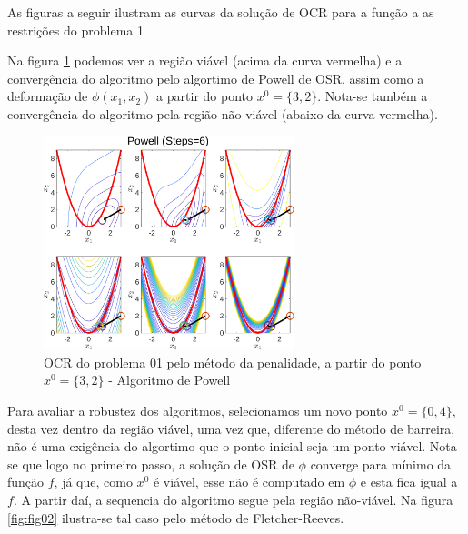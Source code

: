 \documentclass[10pt, a4paper]{article}
\begin{document}

As figuras a seguir ilustram as curvas da solu\c c\~ao de OCR para a fun\c c\~ao a as restri\c c\~oes do problema 1

Na figura \ref{fig:fig01} podemos ver a regi\~ao vi\'avel (acima da curva vermelha) e a converg\^encia do algoritmo pelo algortimo de Powell de OSR, assim como a deforma\c c\~ao de $\phi(x_1,x_2)$ a partir do ponto $x^0=\{3,2\}$. Nota-se tamb\'em a converg\^encia do algoritmo pela regi\~ao n\~ao vi\'avel (abaixo da curva vermelha).

\begin{figure}[H]
      \centering
      \includegraphics[width=0.65\textwidth]{fig01_P01_PEN_X1_POW.png}
      \caption{OCR do problema 01 pelo m\'etodo da penalidade, a partir do ponto $x^0=\{3,2\}$ - Algoritmo de Powell}
      \label{fig:fig01}
\end{figure}

Para avaliar a robustez dos algoritmos, selecionamos um novo ponto $x^0=\{0,4\}$, desta vez dentro da regi\~ao vi\'avel, uma vez que, diferente do m\'etodo de barreira, n\~ao \'e uma exig\^encia do algortimo que o ponto inicial seja um ponto vi\'avel. Nota-se que logo no primeiro passo, a solu\c c\~ao de OSR de $\phi$ converge para m\'inimo da fun\c c\~ao $f$, j\'a que, como $x^0$ \'e vi\'avel, esse n\~ao \'e computado em $\phi$ e esta fica igual a $f$. A partir da\'i, a sequencia do algoritmo segue pela regi\~ao n\~ao-vi\'avel. Na figura \ref{fig:fig02} ilustra-se tal caso pelo m\'etodo de Fletcher-Reeves.
\end{document}
